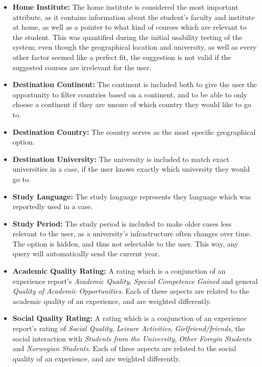 \begin{itemize}
\item \textbf{Home Institute:} The home institute is considered the most important attribute, as it contains information about the student's faculty and institute at home, as well as a pointer to what kind of courses which are relevant to the student. This was quantified during the initial usability testing of the system; even though the geographical location and university, as well as every other factor seemed like a perfect fit, the suggestion is not valid if the suggested courses are irrelevant for the user. 

\item \textbf{Destination Continent:} The continent is included both to give the user the opportunity to filter countries based on a continent, and to be able to only choose a continent if they are unsure of which country they would like to go to. 

\item \textbf{Destination Country:} The country serves as the most specific geographical option.

\item \textbf{Destination University:} The university is included to match exact universities in a case, if the user knows exactly which university they would go to.

\item \textbf{Study Language:} The study language represents they language which was reportedly used in a case. 

\item \textbf{Study Period:} The study period is included to make older cases less relevant to the user, as a university's infrastructure often changes over time. The option is hidden, and thus not selectable to the user. This way, any query will automatically send the current year. 

\item \textbf{Academic Quality Rating:} A rating which is a conjunction of an experience report's \emph{Academic Quality}, \emph{Special Competence Gained} and general \emph{Quality of Academic Opportunities}. Each of these aspects are related to the academic quality of an experience, and are weighted differently.

\item \textbf{Social Quality Rating:} A rating which is a conjunction of an experience report's rating of  \emph{Social Quality}, \emph{Leisure Activities}, \emph{Girlfriend/friends}, the social interaction with \emph{Students from the University}, \emph{Other Foregin Students} and \emph{Norwegian Students}. Each of these aspects are related to the social quality of an experience, and are weighted differently.


\end{itemize}
